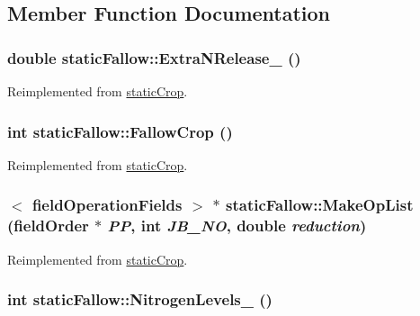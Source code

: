 \subsection{Member Function Documentation}
\hypertarget{classstatic_fallow_abcf18f6c7d1ad76d2b0ab04c35f193d9}{
\subsubsection[{ExtraNRelease\_\-}]{\setlength{\rightskip}{0pt plus 5cm}double staticFallow::ExtraNRelease\_\- ()}}
\label{classstatic_fallow_abcf18f6c7d1ad76d2b0ab04c35f193d9}


Reimplemented from \hyperlink{classstatic_crop_afe0cb8a7831afa941a37338f05227d67}{staticCrop}.\hypertarget{classstatic_fallow_a85c882ab7f143ed8fbb4e6a8d2463bfb}{
\subsubsection[{FallowCrop}]{\setlength{\rightskip}{0pt plus 5cm}int staticFallow::FallowCrop ()}}
\label{classstatic_fallow_a85c882ab7f143ed8fbb4e6a8d2463bfb}


Reimplemented from \hyperlink{classstatic_crop_ac8b14325e2ab05247e9b61e3af331f24}{staticCrop}.\hypertarget{classstatic_fallow_a7aae02eeba095d55e80cd0e71217d4d6}{
\subsubsection[{MakeOpList}]{$<$ {\bf fieldOperationFields} $>$ $\ast$ staticFallow::MakeOpList ({\bf fieldOrder} $\ast$ {\em PP}, \/  int {\em JB\_\-NO}, \/  double {\em reduction})}}
\label{classstatic_fallow_a7aae02eeba095d55e80cd0e71217d4d6}


Reimplemented from \hyperlink{classstatic_crop_a9b67ef1ae531a3afb32b63a4aeb5916b}{staticCrop}.\hypertarget{classstatic_fallow_a35f2275e8346d89412b542bb335fc2dc}{
\subsubsection[{NitrogenLevels\_\-}]{\setlength{\rightskip}{0pt plus 5cm}int staticFallow::NitrogenLevels\_\- ()}}
\label{classstatic_fallow_a35f2275e8346d89412b542bb335fc2dc}


